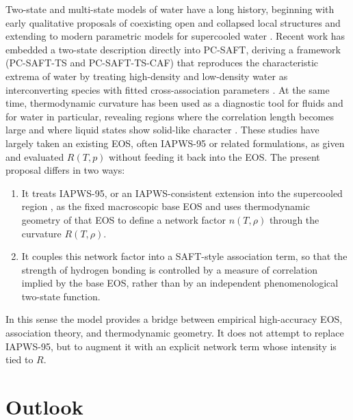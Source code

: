 \documentclass[12pt]{article}
\begin{document}
Two-state and multi-state models of water have a long history, beginning with early qualitative proposals of coexisting open and collapsed local structures and extending to modern parametric models for supercooled water \cite{IAPWS15,Speedy1987}. Recent work has embedded a two-state description directly into PC-SAFT, deriving a framework (PC-SAFT-TS and PC-SAFT-TS-CAF) that reproduces the characteristic extrema of water by treating high-density and low-density water as interconverting species with fitted cross-association parameters \cite{Novak2024,Novak2025}. At the same time, thermodynamic curvature has been used as a diagnostic tool for fluids and for water in particular, revealing regions where the correlation length becomes large and where liquid states show solid-like character \cite{Ruppeiner2012,MayMausbach2015}. These studies have largely taken an existing EOS, often IAPWS-95 or related formulations, as given and evaluated $R(T,p)$ without feeding it back into the EOS. The present proposal differs in two ways:
\begin{enumerate}
  \item It treats IAPWS-95, or an IAPWS-consistent extension into the supercooled region \cite{IAPWS15,IAPWSICRN}, as the fixed macroscopic base EOS and uses thermodynamic geometry of that EOS to define a network factor $n(T,\rho)$ through the curvature $R(T,\rho)$.
  \item It couples this network factor into a SAFT-style association term, so that the strength of hydrogen bonding is controlled by a measure of correlation implied by the base EOS, rather than by an independent phenomenological two-state function.
\end{enumerate}
In this sense the model provides a bridge between empirical high-accuracy EOS, association theory, and thermodynamic geometry. It does not attempt to replace IAPWS-95, but to augment it with an explicit network term whose intensity is tied to $R$.

\section{Outlook}
\end{document}
